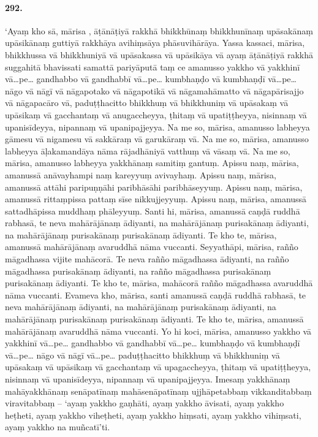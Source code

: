 \paragraph{292.} ‘Ayaṃ kho sā, mārisa , āṭānāṭiyā rakkhā bhikkhūnaṃ bhikkhunīnaṃ upāsakānaṃ upāsikānaṃ guttiyā rakkhāya avihiṃsāya phāsuvihārāya. Yassa kassaci, mārisa, bhikkhussa vā bhikkhuniyā vā upāsakassa vā upāsikāya vā ayaṃ āṭānāṭiyā rakkhā suggahitā bhavissati samattā pariyāputā taṃ ce amanusso yakkho vā yakkhinī vā…pe… gandhabbo vā gandhabbī vā…pe… kumbhaṇḍo vā kumbhaṇḍī vā…pe… nāgo vā nāgī vā nāgapotako vā nāgapotikā vā nāgamahāmatto vā nāgapārisajjo vā nāgapacāro vā, paduṭṭhacitto bhikkhuṃ vā bhikkhuniṃ vā upāsakaṃ vā upāsikaṃ vā gacchantaṃ vā anugaccheyya, ṭhitaṃ vā upatiṭṭheyya, nisinnaṃ vā upanisīdeyya, nipannaṃ vā upanipajjeyya. Na me so, mārisa, amanusso labheyya gāmesu vā nigamesu vā sakkāraṃ vā garukāraṃ vā. Na me so, mārisa, amanusso labheyya āḷakamandāya nāma rājadhāniyā vatthuṃ vā vāsaṃ vā. Na me so, mārisa, amanusso labheyya yakkhānaṃ samitiṃ gantuṃ. Apissu naṃ, mārisa, amanussā anāvayhampi naṃ kareyyuṃ avivayhaṃ. Apissu naṃ, mārisa, amanussā attāhi paripuṇṇāhi paribhāsāhi paribhāseyyuṃ. Apissu naṃ, mārisa, amanussā rittaṃpissa pattaṃ sīse nikkujjeyyuṃ. Apissu naṃ, mārisa, amanussā sattadhāpissa muddhaṃ phāleyyuṃ. Santi hi, mārisa, amanussā caṇḍā ruddhā rabhasā, te neva mahārājānaṃ ādiyanti, na mahārājānaṃ purisakānaṃ ādiyanti, na mahārājānaṃ purisakānaṃ purisakānaṃ ādiyanti. Te kho te, mārisa, amanussā mahārājānaṃ avaruddhā nāma vuccanti. Seyyathāpi, mārisa, rañño māgadhassa vijite mahācorā. Te neva rañño māgadhassa ādiyanti, na rañño māgadhassa purisakānaṃ ādiyanti, na rañño māgadhassa purisakānaṃ purisakānaṃ ādiyanti. Te kho te, mārisa, mahācorā rañño māgadhassa avaruddhā nāma vuccanti. Evameva kho, mārisa, santi amanussā caṇḍā ruddhā rabhasā, te neva mahārājānaṃ ādiyanti, na mahārājānaṃ purisakānaṃ ādiyanti, na mahārājānaṃ purisakānaṃ purisakānaṃ ādiyanti. Te kho te, mārisa, amanussā mahārājānaṃ avaruddhā nāma vuccanti. Yo hi koci, mārisa, amanusso yakkho vā yakkhinī vā…pe… gandhabbo vā gandhabbī vā…pe… kumbhaṇḍo vā kumbhaṇḍī vā…pe… nāgo vā nāgī vā…pe… paduṭṭhacitto bhikkhuṃ vā bhikkhuniṃ vā upāsakaṃ vā upāsikaṃ vā gacchantaṃ vā upagaccheyya, ṭhitaṃ vā upatiṭṭheyya, nisinnaṃ vā upanisīdeyya, nipannaṃ vā upanipajjeyya. Imesaṃ yakkhānaṃ mahāyakkhānaṃ senāpatīnaṃ mahāsenāpatīnaṃ ujjhāpetabbaṃ vikkanditabbaṃ viravitabbaṃ – ‘ayaṃ yakkho gaṇhāti, ayaṃ yakkho āvisati, ayaṃ yakkho heṭheti, ayaṃ yakkho viheṭheti, ayaṃ yakkho hiṃsati, ayaṃ yakkho vihiṃsati, ayaṃ yakkho na muñcatī’ti.


